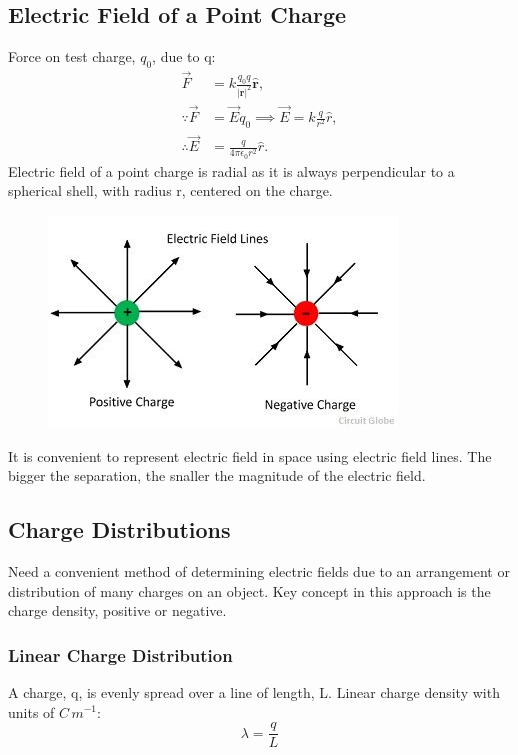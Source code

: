 \documentclass[a4paper, 11pt, normalem]{report}
\begin{document}
\chapter{}
\section{Electric Field of a Point Charge}
Force on test charge, $q_{0}$, due to q:
\begin{align}
    \vec{F} &= k\frac{q_{0}q}{|\mathbf{r}|^{2}} \mathbf{\hat{r}}, \\
    \because \vec{F} &= \vec{E}q_{0} \implies \vec{E} = k\frac{q}{r^{2}}\hat{r}, \\
    \therefore \vec{E} &= \frac{q}{4\pi\epsilon_{0}r^{2}}\hat{r}.
\end{align}
Electric field of a point charge is radial as it is always perpendicular to a spherical shell, with radius r, centered on the charge.
\begin{figure}[H]
    \centering
    \includegraphics{electric-field-line.jpg}
\end{figure}
It is convenient to represent electric field in space using electric field lines. The bigger the separation, the snaller the magnitude of the electric field.

\section{Charge Distributions}
Need a convenient method of determining electric fields due to an arrangement or distribution of many charges on an object.
Key concept in this approach is the charge density, positive or negative.

\subsection{Linear Charge Distribution}
A charge, q, is evenly spread over a line of length, L.
Linear charge density with units of $C\,m^{-1}$:
\begin{equation}
    \lambda = \frac{q}{L}
\end{equation}
\end{document}
